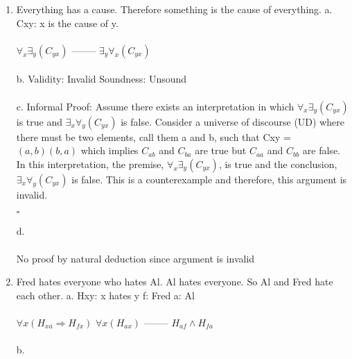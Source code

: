 \documentclass[]{article}
\begin{document}
\begin{enumerate}
    
    \item Everything has a cause. Therefore something is the cause of everything. 
    \newline a. 
    \newline Cxy: x is the cause of y.
    \\\\ $\forall_x \exists_y(C_{yx})$
    \newline --------
    \newline $\exists_y \forall_ x(C_{yx})$
    \\\\b.
    \newline Validity: Invalid
    \newline Soundness: Unsound
    \\\\c.
    \newline Informal Proof:
    \newline  
    \newline Assume there exists an interpretation in which $\forall_x \exists_y(C_{yx})$ is true and $\exists_x \forall_ y(C_{yx})$ is false. Consider a universe of discourse (UD) where there must be two elements, call them a and b, such that Cxy = ${(a,b) (b,a)}$ which implies $C_{ab}$ and $C_{ba}$ are true but $C_{aa}$ and $C_{bb}$ are false. In this interpretation, the premise, $\forall_x\exists_y(C_{yx})$, is true and the conclusion, $\exists_x \forall_y(C_{yx})$ is false. This is a counterexample and therefore, this argument is invalid.
    \begin{flushright}
    $\square$
    \end{flushright}
    d.
    \\\\ No proof by natural deduction since argument is invalid
    \item  Fred hates everyone who hates Al. Al hates everyone. So Al and Fred hate each other.
    \newline a.
    \newline Hxy: x hates y
    \newline f: Fred
    \newline a: Al
    \\\\ $\forall x (H_{xa}\Rightarrow H_{fx})$
    \newline $\forall x(H_{ax})$
    \newline --------
    \newline $H_{af} \land H_{fa}$
    \\\\b.

\end{enumerate}
\end{document}
